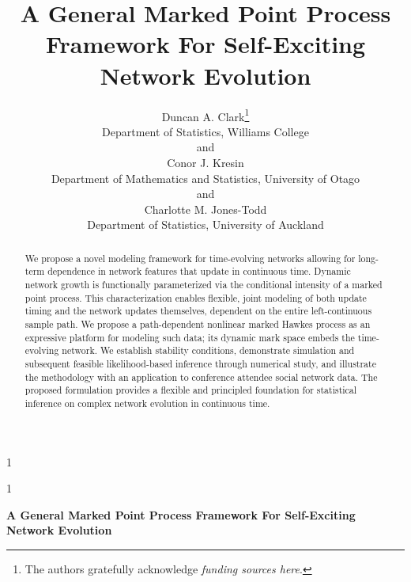 \documentclass[12pt]{article}
\newcommand{\blind}{1}
\def\spacingset#1{\renewcommand{\baselinestretch}%
{#1}\small\normalsize}
\begin{document}

\spacingset{1}

\blind
{
  \title{\bf A General Marked Point Process Framework For Self-Exciting Network Evolution}
  \author{Duncan A. Clark\thanks{
    The authors gratefully acknowledge \textit{funding sources here}.}\hspace{.2cm}\\
    Department of Statistics, Williams College\\
    and \\
    Conor J. Kresin \\
    Department of Mathematics and Statistics, University of Otago\\
    and \\
    Charlotte M. Jones-Todd\\
    Department of Statistics, University of Auckland}
  \maketitle
} \fi

\blind
{
  \bigskip
  \bigskip
  \bigskip
  \begin{center}
    {\LARGE\bf A General Marked Point Process Framework For Self-Exciting Network Evolution}
\end{center}
  \medskip
} \fi

\bigskip

\begin{abstract}

We propose a novel modeling framework for time-evolving networks allowing for long-term dependence in network features that update in continuous time. Dynamic network growth is functionally parameterized via the conditional intensity of a marked point process. This characterization enables flexible, joint modeling of both update timing and the network updates themselves, dependent on the entire left-continuous sample path. We propose a path-dependent nonlinear marked Hawkes process as an expressive platform for modeling such data; its dynamic mark space embeds the time-evolving network. We establish stability conditions, demonstrate simulation and subsequent feasible likelihood-based inference through numerical study, and illustrate the methodology with an application to conference attendee social network data. The proposed formulation provides a flexible and principled foundation for statistical inference on complex network evolution in continuous time.
\end{abstract}
\end{document}
